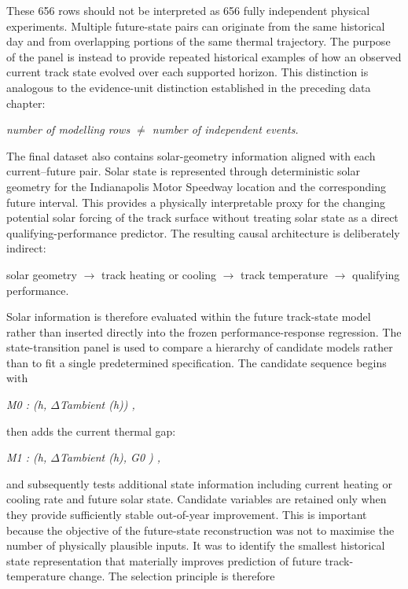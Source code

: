 These 656 rows should not be interpreted as 656 fully independent physical experiments. Multiple future-state pairs can originate from the same historical day and from overlapping portions of the same thermal trajectory. The purpose of the panel is instead to provide repeated historical examples of how an observed current track state evolved over each supported horizon. This distinction is analogous to the evidence-unit distinction established in the preceding data chapter:

\begin{center}\textit{number of modelling rows \ensuremath{\neq} number of independent events.}\end{center}

The final dataset also contains solar-geometry information aligned with each current--future pair. Solar state is represented through deterministic solar geometry for the Indianapolis Motor Speedway location and the corresponding future interval. This provides a physically interpretable proxy for the changing potential solar forcing of the track surface without treating solar state as a direct qualifying-performance predictor. The resulting causal architecture is deliberately indirect:

solar geometry \ensuremath{\rightarrow} track heating or cooling \ensuremath{\rightarrow} track temperature \ensuremath{\rightarrow} qualifying performance.

Solar information is therefore evaluated within the future track-state model rather than inserted directly into the frozen performance-response regression. The state-transition panel is used to compare a hierarchy of candidate models rather than to fit a single predetermined specification. The candidate sequence begins with

\begin{center}\textit{M0 : (h, \ensuremath{\Delta}Tambient (h)) ,}\end{center}

then adds the current thermal gap:

\begin{center}\textit{M1 : (h, \ensuremath{\Delta}Tambient (h), G0 ) ,}\end{center}

and subsequently tests additional state information including current heating or cooling rate and future solar state. Candidate variables are retained only when they provide sufficiently stable out-of-year improvement. This is important because the objective of the future-state reconstruction was not to maximise the number of physically plausible inputs. It was to identify the smallest historical state representation that materially improves prediction of future track-temperature change. The selection principle is therefore

